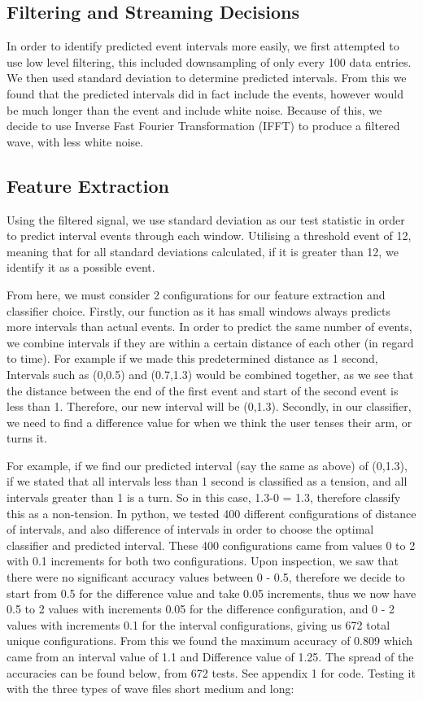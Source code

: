 \documentclass[oneside]{article}
\begin{document}
\subsection{Filtering and Streaming Decisions}
In order to identify predicted event intervals more easily, we first attempted to use low level filtering, this included downsampling of only every 100 data entries. We then used standard deviation to determine predicted intervals. From this we found that the predicted intervals did in fact include the events, however would be much longer than the event and include white noise. Because of this, we decide to use Inverse Fast Fourier Transformation (IFFT) to produce a filtered wave, with less white noise. 



\subsection{Feature Extraction}
Using the filtered signal, we use standard deviation as our test statistic in order to predict interval events through each window. Utilising a threshold event of 12, meaning that for all standard deviations calculated, if it is greater than 12, we identify it as a possible event. 

From here, we must consider 2 configurations for our feature extraction and classifier choice. Firstly, our function as it has small windows always predicts more intervals than actual events. In order to predict the same number of events, we combine intervals if they are within a certain distance of each other (in regard to time). For example if we made this predetermined distance as 1 second, Intervals such as (0,0.5) and (0.7,1.3) would be combined together, as we see that the distance between the end of the first event and start of the second event is less than 1. Therefore, our new interval will be (0,1.3). Secondly, in our classifier, we need to find a difference value for when we think the user tenses their arm, or turns it. 

For example, if we find our predicted interval (say the same as above) of (0,1.3), if we stated that all intervals less than 1 second is classified as a tension, and all intervals greater than 1 is a turn. So in this case, 1.3-0 = 1.3, therefore classify this as a non-tension. In python, we tested 400 different configurations of distance of intervals, and also difference of intervals in order to choose the optimal classifier and predicted interval. These 400 configurations came from values 0 to 2 with 0.1 increments for both two configurations. Upon inspection, we saw that there were no significant accuracy values between 0 - 0.5, therefore we decide to start from 0.5 for the difference value and take 0.05 increments, thus we now have 0.5 to 2 values with increments 0.05 for the difference configuration, and 0 - 2 values with increments 0.1 for the interval configurations, giving us 672 total unique configurations. From this we found the maximum accuracy of 0.809 which came from an interval value of 1.1 and Difference value of 1.25. The spread of the accuracies can be found below, from 672 tests. See appendix 1 for code. Testing it with the three types of wave files short medium and long: 
 
\end{document}
